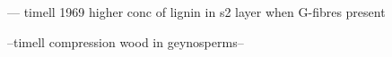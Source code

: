 --- timell 1969 higher conc of lignin in s2 layer when G-fibres present

--timell compression wood in geynosperms--